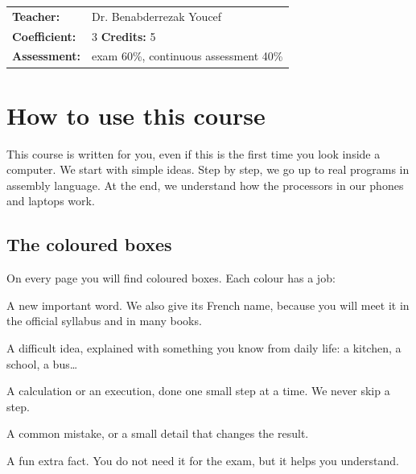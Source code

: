 \documentclass[11pt, a4paper, oneside]{report}
\begin{document}
\begin{titlepage}
\vfill
\begin{flushleft}
    \begin{tabular}{@{}ll}
        \textbf{Teacher:} & Dr. Benabderrezak Youcef \\
        \textbf{Coefficient:} & 3 \quad\textbf{Credits:} 5 \\
        \textbf{Assessment:} & exam 60\%, continuous assessment 40\% \\
    \end{tabular}
\end{flushleft}
\end{titlepage}

\chapter*{How to use this course}

This course is written for you, even if this is the first time you look inside a computer.
We start with simple ideas. Step by step, we go up to real programs in assembly language.
At the end, we understand how the processors in our phones and laptops work.

\section*{The coloured boxes}
On every page you will find coloured boxes. Each colour has a job:

\begin{tarif}
    A new important word. We also give its French name, because you will meet it in the
    official syllabus and in many books.
\end{tarif}
\begin{tashbih}
    A difficult idea, explained with something you know from daily life: a kitchen, a school, a bus\dots
\end{tashbih}
\begin{khatwa}
    A calculation or an execution, done one small step at a time. We never skip a step.
\end{khatwa}
\begin{intabih}
    A common mistake, or a small detail that changes the result.
\end{intabih}
\begin{hal}
    A fun extra fact. You do not need it for the exam, but it helps you understand.
\end{hal}
\end{document}
